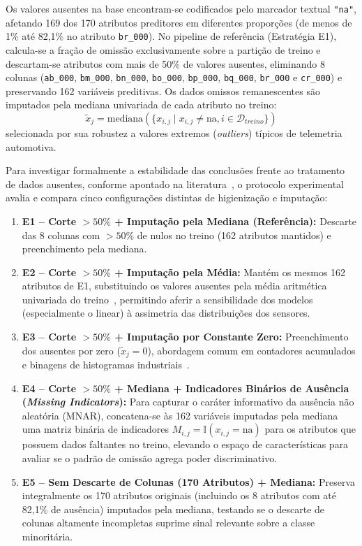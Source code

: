 \documentclass[conference]{IEEEtran}
\begin{document}
Os valores ausentes na base encontram-se codificados pelo marcador textual \texttt{"na"}, afetando 169 dos 170 atributos preditores em diferentes proporções (de menos de 1\% até 82,1\% no atributo \texttt{br\_000}). No pipeline de referência (Estratégia E1), calcula-se a fração de omissão exclusivamente sobre a partição de treino e descartam-se atributos com mais de 50\% de valores ausentes, eliminando 8 colunas (\texttt{ab\_000}, \texttt{bm\_000}, \texttt{bn\_000}, \texttt{bo\_000}, \texttt{bp\_000}, \texttt{bq\_000}, \texttt{br\_000} e \texttt{cr\_000}) e preservando 162 variáveis preditivas. Os dados omissos remanescentes são imputados pela mediana univariada de cada atributo no treino:
\begin{equation}
    \tilde{x}_j = \text{mediana}\left(\{x_{i,j} \mid x_{i,j} \neq \text{na}, i \in \mathcal{D}_{treino}\}\right)
\end{equation}
selecionada por sua robustez a valores extremos (\textit{outliers}) típicos de telemetria automotiva.

Para investigar formalmente a estabilidade das conclusões frente ao tratamento de dados ausentes, conforme apontado na literatura~\cite{rafsunjani2019,costa2016ida}, o protocolo experimental avalia e compara cinco configurações distintas de higienização e imputação:
\begin{enumerate}
    \item \textbf{E1 -- Corte $>50\%$ + Imputação pela Mediana (Referência):} Descarte das 8 colunas com $>50\%$ de nulos no treino (162 atributos mantidos) e preenchimento pela mediana.
    \item \textbf{E2 -- Corte $>50\%$ + Imputação pela Média:} Mantém os mesmos 162 atributos de E1, substituindo os valores ausentes pela média aritmética univariada do treino~\cite{rafsunjani2019}, permitindo aferir a sensibilidade dos modelos (especialmente o linear) à assimetria das distribuições dos sensores.
    \item \textbf{E3 -- Corte $>50\%$ + Imputação por Constante Zero:} Preenchimento dos ausentes por zero ($\tilde{x}_j = 0$), abordagem comum em contadores acumulados e binagens de histogramas industriais~\cite{gondek2016prediction}.
    \item \textbf{E4 -- Corte $>50\%$ + Mediana + Indicadores Binários de Ausência (\textit{Missing Indicators}):} Para capturar o caráter informativo da ausência não aleatória (MNAR), concatena-se às 162 variáveis imputadas pela mediana uma matriz binária de indicadores $M_{i,j} = \mathbb{I}(x_{i,j} = \text{na})$ para os atributos que possuem dados faltantes no treino, elevando o espaço de características para avaliar se o padrão de omissão agrega poder discriminativo.
    \item \textbf{E5 -- Sem Descarte de Colunas (170 Atributos) + Mediana:} Preserva integralmente os 170 atributos originais (incluindo os 8 atributos com até 82,1\% de ausência) imputados pela mediana, testando se o descarte de colunas altamente incompletas suprime sinal relevante sobre a classe minoritária.
\end{enumerate}
\end{document}
